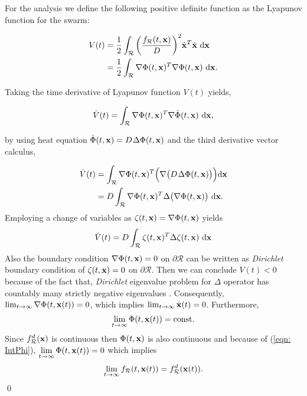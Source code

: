 \documentclass{ifacconf}
\newcommand{\Rconf}{{\mathcal R}}
\newcommand{\bx}{{\bf x}}
\begin{document}
\begin{pf}
	For the analysis we define the following positive definite function as the Lyapunov function for the swarm:
	
	\begin{align}
		V(t) &= \frac{1}{2} \int_\Rconf \bigg(\frac{f_\Rconf(t,\bx)}{D}\bigg)^2 \dot{\bx}^T \dot{\bx} \ \textnormal{d} \bx \\
		&= \frac{1}{2} \int_\Rconf \nabla\Phi(t,\bx)^T \nabla\Phi(t,\bx) \ \textnormal{d} \bx.
	\end{align}
	
	 Taking the time derivative of Lyapunov function $V(t)$ yields,
	
	\begin{equation*}
		\dot{V}(t) = \int_\Rconf \nabla\Phi(t,\bx)^T \nabla\dot{\Phi}(t,\bx) \ \textnormal{d} \bx,
	\end{equation*}
	
	by using heat equation $\dot{\Phi}(t,\bx) = D \hspace{0.3mm} \Delta\Phi(t,\bx)$ and the third derivative vector calculus,
	
	\begin{align*}
		\dot{V}(t)	&= \int_\Rconf \nabla\Phi(t,\bx)^T \Big(\nabla\big(D \hspace{0.3mm} \Delta\Phi(t,\bx)\big) \Big) \textnormal{d} \bx \\
		&= D \int_\Rconf \nabla\Phi(t,\bx)^T \Delta\big(\nabla\Phi(t,\bx)\big) \ \textnormal{d} \bx.
	\end{align*}
Employing a change of variables as $\zeta(t,\bx) = \nabla\Phi(t,\bx)$ yields
	\begin{align*}
		\dot{V}(t) = D \int_\Rconf  \zeta(t,\bx)^T\Delta\zeta(t,\bx) \ \textnormal{d} \bx \\
	 \end{align*}
	 Also the boundary condition $\nabla\Phi(t,\bx) = 0$ on $\partial \Rconf$ can be written as \emph{Dirichlet} boundary condition of  $\zeta(t,\bx) = 0$ on $\partial \Rconf$. Then we can conclude $\dot{V}(t) < 0$ because of the fact that, \emph{Dirichlet} eigenvalue problem for $\Delta$ operator has countably many strictly negative eigenvalues  \cite{li1983schrodinger}. Consequently, $\lim_{t \rightarrow \infty} \nabla\Phi(t,\bx(t)) = 0$, which implies $\lim_{t \rightarrow \infty} \dot{\bx}(t) = 0$. Furthermore, 
\vspace{2mm}
	\begin{equation} \label{eqn: biasedDensity}
		\lim\limits_{t \rightarrow \infty} \Phi(t,\bx(t)) = \textnormal{const}.
	\end{equation}
%
	Since $f_\Rconf^d(\bx)$ is continuous then $\Phi(t,\bx)$ is also continuous and because of (\ref{eqn: IntPhi}), %
    $\lim\limits_{t \rightarrow \infty} \Phi(t,\bx(t)) = 0$ which implies 
\vspace{2mm}
	\begin{equation*}
		\lim\limits_{t \rightarrow \infty} f_\Rconf(t,\bx(t)) = f_\Rconf^d(\bx(t)). 
	\end{equation*}
	\hspace{8.25cm} \qed
\end{pf}
\end{document}
